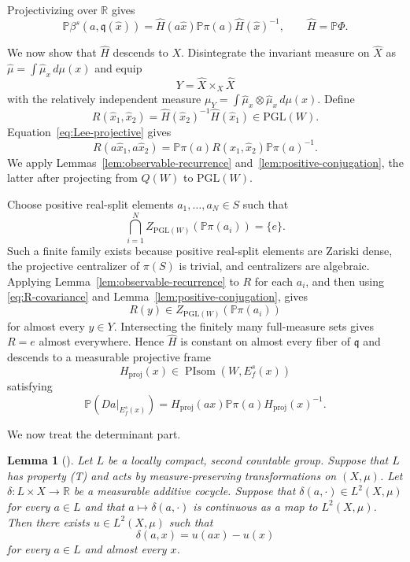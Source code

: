 \documentclass[11pt]{amsart}
\numberwithin{equation}{section}
\newcommand{\R}{\mathbb{R}}
\newcommand{\PGL}{\mathrm{PGL}}
\theoremstyle{plain}
\newtheorem{lem}[thm]{Lemma}
\begin{document}
Projectivizing over $\R$ gives
\begin{equation}\label{eq:Lee-projective}
\mathbb P\beta^s(a,\mathfrak q(\hat x))
 =\widehat H(a\hat x)\mathbb P\pi(a)\widehat H(\hat x)^{-1},
\qquad \widehat H=\mathbb P\Phi.
\end{equation}


We now show that $\widehat H$ descends to $X$. Disintegrate the
invariant measure on $\widehat X$ as
$\hat\mu=\int\hat\mu_x\,d\mu(x)$ and equip
\[
Y=\widehat X\times_X\widehat X
\]
with the relatively independent measure
$\mu_Y=\int\hat\mu_x\otimes\hat\mu_x\,d\mu(x)$. Define
\[
R(\hat x_1,\hat x_2)
 =\widehat H(\hat x_2)^{-1}\widehat H(\hat x_1)
 \in\PGL(W).
\]
Equation~\eqref{eq:Lee-projective} gives
\begin{equation}\label{eq:R-covariance}
R(a\hat x_1,a\hat x_2)
 =\mathbb P\pi(a)R(\hat x_1,\hat x_2)\mathbb P\pi(a)^{-1}.
\end{equation}
We apply Lemmas~\ref{lem:observable-recurrence}
and~\ref{lem:positive-conjugation}, the latter after projecting from
$Q(W)$ to $\PGL(W)$.

Choose positive real-split elements $a_1,\ldots,a_N\in S$ such that
\[
\bigcap_{i=1}^N
Z_{\PGL(W)}(\mathbb P\pi(a_i))=\{e\}.
\]
Such a finite family exists because positive real-split elements are
Zariski dense, the projective centralizer of $\pi(S)$ is trivial,
and centralizers are algebraic. Applying
Lemma~\ref{lem:observable-recurrence} to $R$ for each $a_i$, and then
using \eqref{eq:R-covariance} and
Lemma~\ref{lem:positive-conjugation}, gives
\[
R(y)\in Z_{\PGL(W)}(\mathbb P\pi(a_i))
\]
for almost every $y\in Y$. Intersecting the finitely many
full-measure sets gives $R=e$ almost everywhere. Hence
$\widehat H$ is constant on almost every fiber of $\mathfrak q$ and descends to
a measurable projective frame
\[
H_{\mathrm{proj}}(x)\in
\operatorname{PIsom}(W,E_f^s(x))
\]
satisfying
\begin{equation}\label{eq:projective-base}
\mathbb P(Da|_{E_f^s(x)})
 =H_{\mathrm{proj}}(ax)\mathbb P\pi(a)
  H_{\mathrm{proj}}(x)^{-1}.
\end{equation}

We now treat the determinant part.

\begin{lem}[{\cite[Proposition~2.2.10 and Theorem~2.12.4]{BHV}}]
\label{lem:real-cocycle-T}
Let $L$ be a locally compact, second countable group.  Suppose that
$L$ has property {\rm (T)} and acts by measure-preserving transformations on
$(X,\mu)$. Let $\delta:L\times X\to\mathbb R$ be a measurable
additive cocycle. Suppose that $\delta(a,\cdot)\in L^2(X,\mu)$ for
every $a\in L$ and that $a\mapsto\delta(a,\cdot)$ is continuous as a
map to $L^2(X,\mu)$. Then there exists $u\in L^2(X,\mu)$ such that
\[
\delta(a,x)=u(ax)-u(x)
\]
for every $a\in L$ and almost every $x$.
\end{lem}
\end{document}
